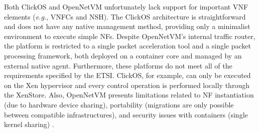 Both ClickOS and OpenNetVM unfortunately lack support for important VNF elements (\textit{e.g.}, VNFCs and NSH). The ClickOS architecture is straightforward and does not have any native management method, providing only a minimalist environment to execute simple NFs. Despite OpenNetVM's internal traffic router, the platform is restricted to a single packet acceleration tool and a single packet processing framework, both deployed on a container core and managed by an external native agent. Furthermore, these platforms do not meet all of the requirements specified by the ETSI. ClickOS, for example, can only be executed on the Xen hypervisor and every control operation is performed locally through the XenStore. Also, OpenNetVM presents limitations related to NF instantiation (due to hardware device sharing), portability (migrations are only possible between compatible infrastructures), and security issues with containers (single kernel sharing) \cite{Manco-2017}.
